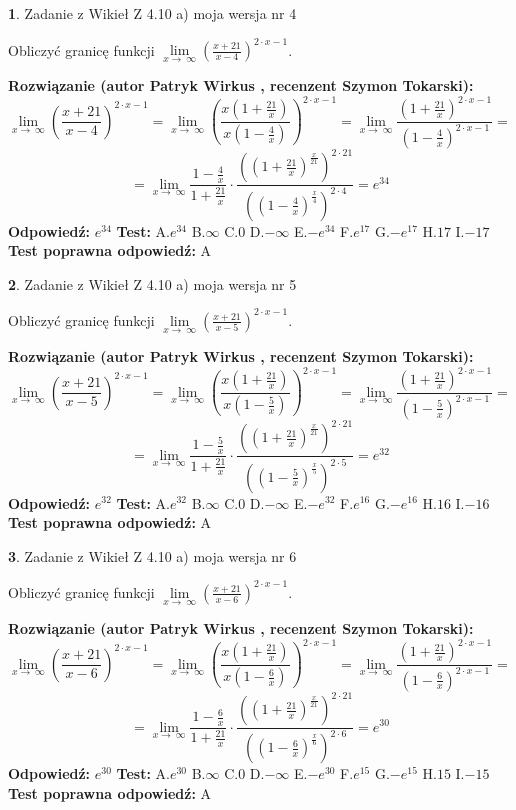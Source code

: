 \documentclass[12pt, a4paper]{article}
\theoremstyle{definition} %
\newtheorem{zad}{}
\newcommand{\zadStart}[1]{\begin{zad}#1\newline}
\newcommand{\zadStop}{\end{zad}}
\newcommand{\rozwStart}[2]{\noindent \textbf{Rozwiązanie (autor #1 , recenzent #2): }\newline}
\newcommand{\rozwStop}{\newline}
\newcommand{\odpStart}{\noindent \textbf{Odpowiedź:}\newline}
\newcommand{\odpStop}{\newline}
\newcommand{\testStart}{\noindent \textbf{Test:}\newline}
\newcommand{\testStop}{\newline}
\newcommand{\kluczStart}{\noindent \textbf{Test poprawna odpowiedź:}\newline}
\newcommand{\kluczStop}{\newline}
\begin{document}
\zadStart{Zadanie z Wikieł Z 4.10 a) moja wersja nr 4}

Obliczyć granicę funkcji  $\lim\limits_{x\to\ \infty}(\frac{x+21}{x-4})^{2\cdot x-1}$.
\zadStop
\rozwStart{Patryk Wirkus}{Szymon Tokarski}
$$\lim\limits_{x\to\ \infty}(\frac{x+21}{x-4})^{2\cdot x-1} = \lim\limits_{x\to\ \infty}(\frac{x(1+\frac{21}{x})}{x(1-\frac{4}{x})})^{2\cdot x-1}=\lim\limits_{x\to\ \infty}\frac{(1+\frac{21}{x})^{2\cdot x-1}}{(1-\frac{4}{x})^{2\cdot x-1}}=$$
$$=\lim\limits_{x\to\ \infty}\frac{1-\frac{4}{x}}{1+\frac{21}{x}}\cdot\frac{((1+\frac{21}{x})^{\frac{x}{21}})^{2\cdot21}}{((1-\frac{4}{x})^{\frac{x}{4}})^{2\cdot4}}=e^{34}$$
\rozwStop
\odpStart
$e^{34}$
\odpStop
\testStart
A.$e^{34}$ B.$\infty$ C.$0$ D.$-\infty$ E.$-e^{34}$
F.$e^{17}$ G.$-e^{17}$
H.$17$
I.$-17$
\testStop
\kluczStart
A
\kluczStop



\zadStart{Zadanie z Wikieł Z 4.10 a) moja wersja nr 5}

Obliczyć granicę funkcji  $\lim\limits_{x\to\ \infty}(\frac{x+21}{x-5})^{2\cdot x-1}$.
\zadStop
\rozwStart{Patryk Wirkus}{Szymon Tokarski}
$$\lim\limits_{x\to\ \infty}(\frac{x+21}{x-5})^{2\cdot x-1} = \lim\limits_{x\to\ \infty}(\frac{x(1+\frac{21}{x})}{x(1-\frac{5}{x})})^{2\cdot x-1}=\lim\limits_{x\to\ \infty}\frac{(1+\frac{21}{x})^{2\cdot x-1}}{(1-\frac{5}{x})^{2\cdot x-1}}=$$
$$=\lim\limits_{x\to\ \infty}\frac{1-\frac{5}{x}}{1+\frac{21}{x}}\cdot\frac{((1+\frac{21}{x})^{\frac{x}{21}})^{2\cdot21}}{((1-\frac{5}{x})^{\frac{x}{5}})^{2\cdot5}}=e^{32}$$
\rozwStop
\odpStart
$e^{32}$
\odpStop
\testStart
A.$e^{32}$ B.$\infty$ C.$0$ D.$-\infty$ E.$-e^{32}$
F.$e^{16}$ G.$-e^{16}$
H.$16$
I.$-16$
\testStop
\kluczStart
A
\kluczStop



\zadStart{Zadanie z Wikieł Z 4.10 a) moja wersja nr 6}

Obliczyć granicę funkcji  $\lim\limits_{x\to\ \infty}(\frac{x+21}{x-6})^{2\cdot x-1}$.
\zadStop
\rozwStart{Patryk Wirkus}{Szymon Tokarski}
$$\lim\limits_{x\to\ \infty}(\frac{x+21}{x-6})^{2\cdot x-1} = \lim\limits_{x\to\ \infty}(\frac{x(1+\frac{21}{x})}{x(1-\frac{6}{x})})^{2\cdot x-1}=\lim\limits_{x\to\ \infty}\frac{(1+\frac{21}{x})^{2\cdot x-1}}{(1-\frac{6}{x})^{2\cdot x-1}}=$$
$$=\lim\limits_{x\to\ \infty}\frac{1-\frac{6}{x}}{1+\frac{21}{x}}\cdot\frac{((1+\frac{21}{x})^{\frac{x}{21}})^{2\cdot21}}{((1-\frac{6}{x})^{\frac{x}{6}})^{2\cdot6}}=e^{30}$$
\rozwStop
\odpStart
$e^{30}$
\odpStop
\testStart
A.$e^{30}$ B.$\infty$ C.$0$ D.$-\infty$ E.$-e^{30}$
F.$e^{15}$ G.$-e^{15}$
H.$15$
I.$-15$
\testStop
\kluczStart
A
\kluczStop
\end{document}
